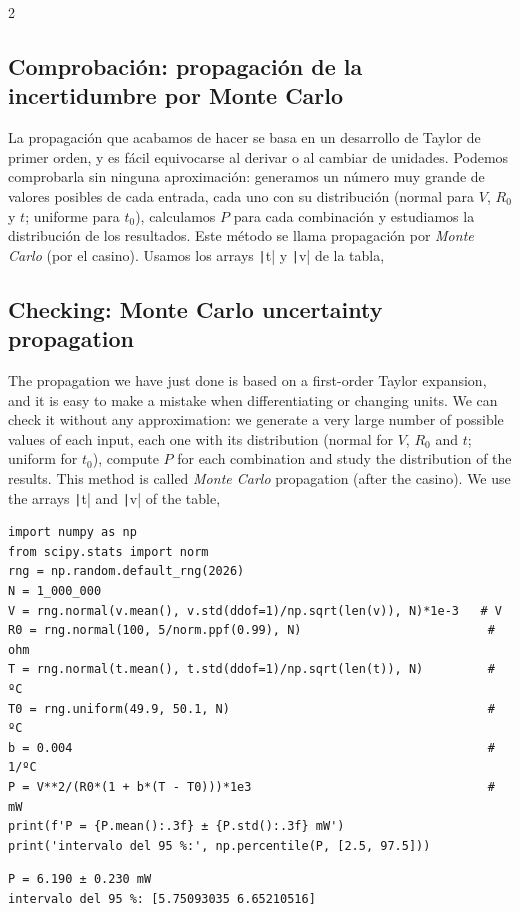 \begin{paracol}{2}
\subsection{Comprobación: propagación de la incertidumbre por Monte Carlo}\label{sec:propmc}
La propagación que acabamos de hacer se basa en un desarrollo de Taylor de primer orden, y es fácil equivocarse al derivar o al cambiar de unidades. Podemos comprobarla sin ninguna aproximación: generamos un número muy grande de valores posibles de cada entrada, cada uno con su distribución (normal para $V$, $R_0$ y $t$; uniforme para $t_0$), calculamos $P$ para cada combinación y estudiamos la distribución de los resultados. Este método se llama propagación por \emph{Monte Carlo} (por el casino). Usamos los arrays \texttt|t| y \texttt|v| de la tabla,
\switchcolumn
\subsection{Checking: Monte Carlo uncertainty propagation}\label{sec:propmc-2}
The propagation we have just done is based on a first-order Taylor expansion, and it is easy to make a mistake when differentiating or changing units. We can check it without any approximation: we generate a very large number of possible values of each input, each one with its distribution (normal for $V$, $R_0$ and $t$; uniform for $t_0$), compute $P$ for each combination and study the distribution of the results. This method is called \emph{Monte Carlo} propagation (after the casino). We use the arrays \texttt|t| and \texttt|v| of the table,
\end{paracol}
\begin{verbatim}
import numpy as np
from scipy.stats import norm
rng = np.random.default_rng(2026)
N = 1_000_000
V = rng.normal(v.mean(), v.std(ddof=1)/np.sqrt(len(v)), N)*1e-3   # V
R0 = rng.normal(100, 5/norm.ppf(0.99), N)                          # ohm
T = rng.normal(t.mean(), t.std(ddof=1)/np.sqrt(len(t)), N)         # ºC
T0 = rng.uniform(49.9, 50.1, N)                                    # ºC
b = 0.004                                                          # 1/ºC
P = V**2/(R0*(1 + b*(T - T0)))*1e3                                 # mW
print(f'P = {P.mean():.3f} ± {P.std():.3f} mW')
print('intervalo del 95 %:', np.percentile(P, [2.5, 97.5]))
\end{verbatim}
\begin{verbatim}
P = 6.190 ± 0.230 mW
intervalo del 95 %: [5.75093035 6.65210516]
\end{verbatim}
